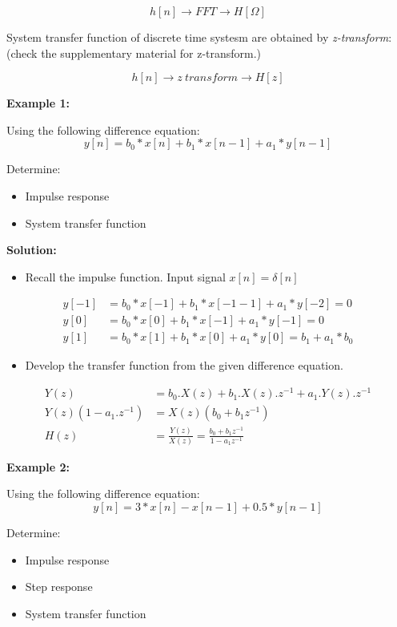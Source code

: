 $$ h[n] \rightarrow FFT \rightarrow H[\Omega] $$

System transfer function of discrete time systesm are obtained by \textit{z-transform}: (check the supplementary material  for z-transform.)

$$ h[n] \rightarrow z\ transform \rightarrow H[z] $$

\textbf{Example 1:}

Using the following difference equation:
$$ y[n] = b_0*x[n] + b_1*x[n-1] + a_1*y[n-1] $$

Determine:


\begin{itemize}

	\item Impulse response
	\item System transfer function

\end{itemize}

\textbf{Solution:}

\begin{itemize}
	\item Recall the impulse function. Input signal $x[n] = \delta[n]$
\end{itemize}

\begin{align*}
	y[-1] &= b_0*x[-1] + b_1*x[-1-1] + a_1*y[-2] = 0 \\
	y[0] &= b_0*x[0] + b_1*x[-1] + a_1*y[-1] = 0 \\
	y[1] &= b_0*x[1] + b_1*x[0] + a_1*y[0] = b_1 + a_1*b_0
\end{align*}


\begin{itemize}
	\item Develop the transfer function from the given difference equation.
\end{itemize}

\begin{align*}
	Y(z) &= b_0.X(z) + b_1.X(z).z^{-1} + a_1.Y(z).z^{-1} \\
	Y(z)(1-a_1.z^{-1}) &= X(z)(b_0 + b_1z^{-1}) \\
	H(z) &= \frac{Y(z)}{X(z)} = \frac{b_0+b_1z^{-1}}{1-a_1z^{-1}}
\end{align*}


\textbf{Example 2:}

Using the following difference equation:
$$ y[n] = 3*x[n] - x[n-1] + 0.5*y[n-1] $$

Determine:

\begin{itemize}
	\item Impulse response
	\item Step response
	\item System transfer function
\end{itemize}


